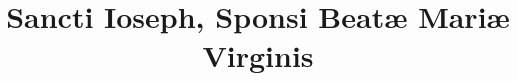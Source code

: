 \documentclass[17pt]{extarticle}
\begin{document}
\title{Sancti Ioseph, Sponsi Beatæ Mariæ Virginis}
\makereadingtitle

\end{document}

